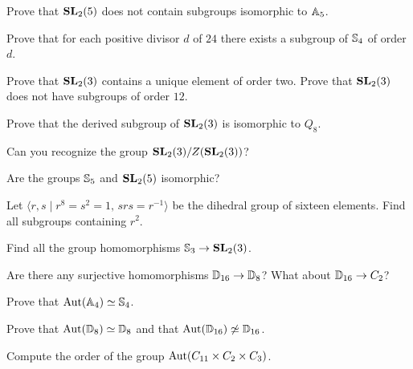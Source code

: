 \begin{prob}
    Prove that $\mathbf{SL}_2(5)$ does not contain subgroups isomorphic to $\mathbb{A}_5$. 
\end{prob}

\begin{prob}
  Prove that for each positive divisor $d$ of $24$ there exists a subgroup of $\mathbb{S}_4$ of order $d$.
\end{prob}

\begin{prob} 
  Prove that $\mathbf{SL}_2(3)$ contains a unique element of order two. Prove that
  $\mathbf{SL}_2(3)$ does not have subgroups of order $12$.
\end{prob}

\begin{prob}
  Prove that the derived subgroup of $\mathbf{SL}_2(3)$ is isomorphic to $Q_8$.
\end{prob}

\begin{prob}
  Can you recognize the group $\mathbf{SL}_2(3)/Z(\mathbf{SL}_2(3))$? 
\end{prob}

\begin{prob}
  Are the groups $\mathbb{S}_5$ and $\mathbf{SL}_2(5)$ isomorphic?
\end{prob}

\begin{prob}
  Let $\langle r,s\mid 
  r^8=s^2=1,\,srs=r^{-1}\rangle$ be the dihedral group of sixteen elements. 
  Find all subgroups containing $r^2$.
\end{prob}

\begin{prob}
  Find all the group homomorphisms $\mathbb{S}_3\to\mathbf{SL}_2(3)$. 
\end{prob}

\begin{prob}
    Are there any surjective homomorphisms $\mathbb{D}_{16}\to\mathbb{D}_{8}$? What about
    $\mathbb{D}_{16}\to C_2$?
\end{prob}

\begin{prob}
  \label{prob:Aut(A4)=S4}
   Prove that $\operatorname{Aut}(\mathbb{A}_4)\simeq\mathbb{S}_4$.
\end{prob}

\begin{prob}
  Prove that $\operatorname{Aut}(\mathbb{D}_8)\simeq\mathbb{D}_8$ and that 
  $\operatorname{Aut}(\mathbb{D}_{16})\not\simeq\mathbb{D}_{16}$.
\end{prob}

\begin{prob}
Compute the order of the group $\operatorname{Aut}(C_{11}\times C_2\times C_3)$. 
\end{prob}

